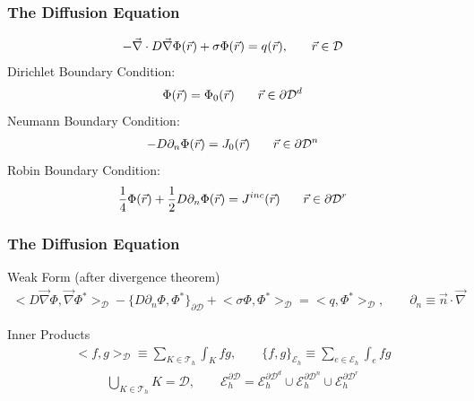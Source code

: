 \documentclass[]{beamer}
\begin{document}
\subsection{}
\begin{frame}[t]\frametitle{The Diffusion Equation}
	\begin{block}{} {\small 
     		\begin{align*}
 	 		{ \small -\vec{\nabla} \cdot D \vec{\nabla} \Phi (\vec{r}) + \sigma \Phi (\vec{r}) = q (\vec{r}), \qquad  \vec{r} \in \mathcal{D} }
        	\end{align*} 
		Dirichlet Boundary Condition:
		\begin{align*}
 	 		{ \small \Phi (\vec{r})  = \Phi_0 (\vec{r})  \qquad \vec{r} \in \partial \mathcal{D}^d }
        	\end{align*} 
		Neumann Boundary Condition:
		\begin{align*}
 	 		{ \small -D \partial_n \Phi (\vec{r})  = J_0 (\vec{r})  \qquad \vec{r} \in \partial \mathcal{D}^n }
        	\end{align*} 
		Robin Boundary Condition:
		\begin{align*}
 	 		{ \small \frac{1}{4} \Phi (\vec{r})  + \frac{1}{2}D \partial_n \Phi (\vec{r})  = J^{inc} (\vec{r})  \qquad \vec{r} \in \partial \mathcal{D}^r}
        	\end{align*} }
    \end{block}
\end{frame}
\begin{frame}[t]\frametitle{The Diffusion Equation}
	\begin{block}{Weak Form (after divergence theorem)} {\small
		\begin{gather*}
			\Big<  D \vec{\nabla}  \Phi , \vec{\nabla} \Phi^*  \Big>_{\mathcal{D}} - \Big\{    D \partial_n \Phi, \Phi^* \Big\}_{\partial \mathcal{D}} + \Big< \sigma  \Phi ,  \Phi^*  \Big>_{\mathcal{D}} = \Big<q,  \Phi^*  \Big>_{\mathcal{D}}, \qquad \partial_n \equiv \vec{n} \cdot \vec{\nabla}
		\end{gather*}}
	\end{block}
	\begin{block}{Inner Products} {\small
		\begin{gather*}
			\Big<  f , g  \Big>_{\mathcal{D}} \equiv \sum_{K \in \mathcal{T}_h} \int_{K} f  g,  \qquad \Big\{  f , g  \Big\}_{ \mathcal{E}_h} \equiv \sum_{e \in \mathcal{E}_h} \int_{e} f  g
		\end{gather*}
		\begin{gather*}
			\bigcup_{K \in \mathcal{T}_h} K = \mathcal{D},  \qquad \mathcal{E}_h^{\partial \mathcal{D}} =  \mathcal{E}_h^{\partial \mathcal{D}^d} \cup \mathcal{E}_h^{\partial \mathcal{D}^n} \cup \mathcal{E}_h^{\partial \mathcal{D}^r}
		\end{gather*}
	}\end{block}
\end{frame}
\end{document}
